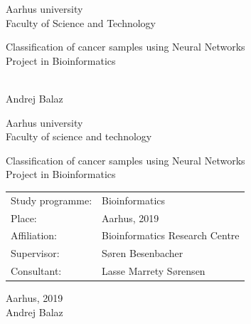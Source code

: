 \documentclass[12pt,oneside]{book}
\def \year {2019}
\def \title {Classification of cancer samples using Neural Networks}
\def \type {Project in Bioinformatics}
\def \author {Andrej Balaz}
\def \supervisor {Søren Besenbacher}
\def \consultant {Lasse Marrety Sørensen}
\def \place{Aarhus, \year}
\def \programme {Bioinformatics}
\def \affiliation {Bioinformatics Research Centre}
\begin{document}
    \frontmatter

    \thispagestyle{empty}

    \begin{center}
    \sc\large
    Aarhus university \\
    Faculty of Science and Technology

    \vfill

    {\LARGE\title}\\
    \type
    \end{center}

\vfill

{\sc\large 
\noindent \year\\
\author
}

\cleardoublepage

\thispagestyle{empty}
\noindent

\begin{center}
\sc\large
Aarhus university\\
Faculty of science and technology

\vfill

{\LARGE\title}\\
\type
\end{center}

\vfill

\noindent
\begin{tabular}{ll}
Study programme: & \programme \\
Place: & \place \\
Affiliation: & \affiliation \\
Supervisor: & \supervisor \\
Consultant: & \consultant \\
\end{tabular}

\vfill


\noindent \place\\
\author

\end{document}
